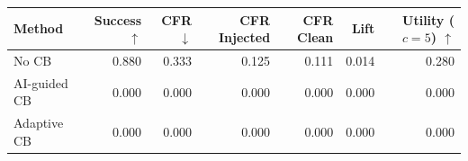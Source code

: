 \begin{tabular}{lrrrrrr}
\toprule
Method & Success $\uparrow$ & CFR $\downarrow$ & CFR Injected & CFR Clean & Lift & Utility ($c=5$) $\uparrow$ \\
\midrule
No CB & 0.880 & 0.333 & 0.125 & 0.111 & 0.014 & 0.280 \\
AI-guided CB & 0.000 & 0.000 & 0.000 & 0.000 & 0.000 & 0.000 \\
Adaptive CB & 0.000 & 0.000 & 0.000 & 0.000 & 0.000 & 0.000 \\
\bottomrule
\end{tabular}
